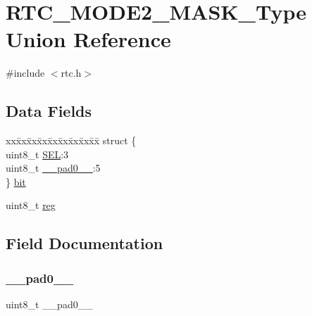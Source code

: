 \hypertarget{union_r_t_c___m_o_d_e2___m_a_s_k___type}{}\section{R\+T\+C\+\_\+\+M\+O\+D\+E2\+\_\+\+M\+A\+S\+K\+\_\+\+Type Union Reference}
\label{union_r_t_c___m_o_d_e2___m_a_s_k___type}


{\ttfamily \#include $<$rtc.\+h$>$}

\subsection*{Data Fields}
\begin{DoxyCompactItemize}
\item 
\begin{tabbing}
xx\=xx\=xx\=xx\=xx\=xx\=xx\=xx\=xx\=\kill
struct \{\\
\>uint8\_t \mbox{\hyperlink{union_r_t_c___m_o_d_e2___m_a_s_k___type_a858f4a0aa39020bb681254ec2371a3d6}{SEL}}:3\\
\>uint8\_t \mbox{\hyperlink{union_r_t_c___m_o_d_e2___m_a_s_k___type_a8b4eebe79ded0459acec2f4950102ba3}{\_\_pad0\_\_}}:5\\
\} \mbox{\hyperlink{union_r_t_c___m_o_d_e2___m_a_s_k___type_a6d425ee8382b570ba8d344ac760e48c5}{bit}}\\

\end{tabbing}\item 
uint8\+\_\+t \mbox{\hyperlink{union_r_t_c___m_o_d_e2___m_a_s_k___type_a9428adc9af4653a2050e2536b55dec8d}{reg}}
\end{DoxyCompactItemize}


\subsection{Field Documentation}
\mbox{\label{union_r_t_c___m_o_d_e2___m_a_s_k___type_a8b4eebe79ded0459acec2f4950102ba3}} 
\subsubsection{\texorpdfstring{\_\_pad0\_\_}{\_\_pad0\_\_}}
{\footnotesize\ttfamily uint8\+\_\+t \+\_\+\+\_\+pad0\+\_\+\+\_\+}

